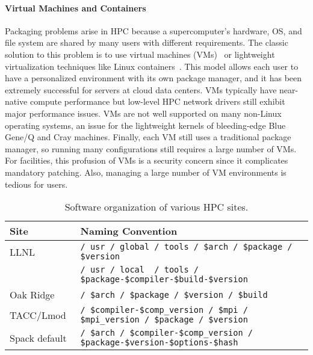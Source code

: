 \paragraph{Virtual Machines and Containers}

Packaging problems arise in HPC because a supercomputer's hardware, OS, and
file system are shared by many users with different requirements.  The classic
solution to this problem is to use virtual
machines (VMs)~\cite{barham2003xen,rosenblum1999vmware,smith2005architecture}
or lightweight virtualization techniques like Linux
containers~\cite{felter2014updated,merkel2014docker}. This model allows each
 user to have a personalized environment with its own package manager, and it
has been extremely successful for servers at cloud data centers. VMs typically
have near-native compute performance but low-level HPC network drivers still
exhibit major performance issues. VMs are not well supported on many
non-Linux operating systems, an issue for the lightweight
kernels of bleeding-edge Blue Gene/Q and Cray machines.
Finally, each VM still uses a traditional package manager,
so running many configurations still requires a large number of VMs.
For facilities, this profusion of VMs is a security concern since it
complicates mandatory patching. Also, managing  a large number of VM
environments is tedious for users.

\begin{table*}\centering
\begin{tabular}{|l|l|}
\hline
Site           & Naming Convention \\
\hline
\hline
LLNL       & {\tt / usr / global / tools / \$arch / \$package / \$version} \\
           & {\tt / usr / local~ / tools / \$package-\$compiler-\$build-\$version } \\
\hline
Oak Ridge~\cite{jones+:cug08}  & {\tt / \$arch / \$package / \$version / \$build} \\
\hline
TACC/Lmod~\cite{mclay:lmod-tutorial}& {\tt / \$compiler-\$comp\_version / \$mpi / \$mpi\_version / \$package / \$version} \\
\hline
\hline
Spack default                  & {\tt / \$arch / \$compiler-\$comp\_version / \$package-\$version-\$options-\$hash} \\
\hline
\end{tabular}
\caption{
	Software organization of various HPC sites.
	\label{tab:naming-conventions}
}
\end{table*}

